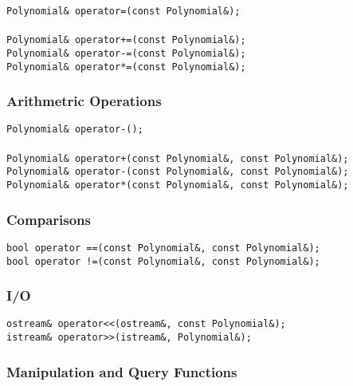 \begin{progb} {
\> \tt   Polynomial\& operator=(const Polynomial\&); \\ 
\\
\> \tt 	 Polynomial\& operator+=(const Polynomial\&); \\
\> \tt 	 Polynomial\& operator-=(const Polynomial\&); \\
\> \tt 	 Polynomial\& operator*=(const Polynomial\&); 
}\end{progb}

\subsubsection{Arithmetric Operations}

\begin{progb} {
\> \tt   Polynomial\& operator-(); \\ 
\\
\> \tt 	 Polynomial\& operator+(const Polynomial\&, const Polynomial\&); \\
\> \tt 	 Polynomial\& operator-(const Polynomial\&, const Polynomial\&); \\
\> \tt 	 Polynomial\& operator*(const Polynomial\&, const Polynomial\&); 
}\end{progb}

\subsubsection{Comparisons}

\begin{progb} {
\> \tt 	 bool operator ==(const Polynomial\&, const Polynomial\&); \\
\> \tt 	 bool operator !=(const Polynomial\&, const Polynomial\&); 
}\end{progb}

\subsubsection{I/O}

\begin{progb} {
\> \tt 	 ostream\& operator<<(ostream\&, const Polynomial\&);\\
\> \tt 	 istream\& operator>>(istream\&, Polynomial\&);
}\end{progb}

\subsubsection{Manipulation and Query Functions}

